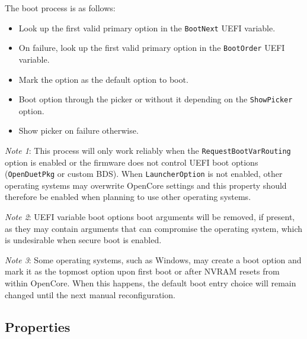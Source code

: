 \documentclass[]{article}
\providecommand{\tightlist}{%
  \setlength{\itemsep}{0pt}\setlength{\parskip}{0pt}}
\begin{document}
The boot process is as follows:
\begin{itemize}
\tightlist
\item Look up the first valid primary option in the \texttt{BootNext} UEFI variable.
\item On failure, look up the first valid primary option in the \texttt{BootOrder} UEFI variable.
\item Mark the option as the default option to boot.
\item Boot option through the picker or without it depending on the \texttt{ShowPicker} option.
\item Show picker on failure otherwise.
\end{itemize}

\emph{Note 1}: This process will only work reliably when the \texttt{RequestBootVarRouting}
option is enabled or the firmware does not control UEFI boot options (\texttt{OpenDuetPkg} or
custom BDS). When \texttt{LauncherOption} is not enabled, other operating systems may
overwrite OpenCore settings and this property should therefore be enabled when planning
to use other operating systems.

\emph{Note 2}: UEFI variable boot options boot arguments will be removed, if present, as
they may contain arguments that can compromise the operating system, which is undesirable
when secure boot is enabled.

\emph{Note 3}: Some operating systems, such as Windows, may create a boot option and mark it as
the topmost option upon first boot or after NVRAM resets from within OpenCore. When this happens,
the default boot entry choice will remain changed until the next manual reconfiguration.

\subsection{Properties}\label{miscprops}
\end{document}
